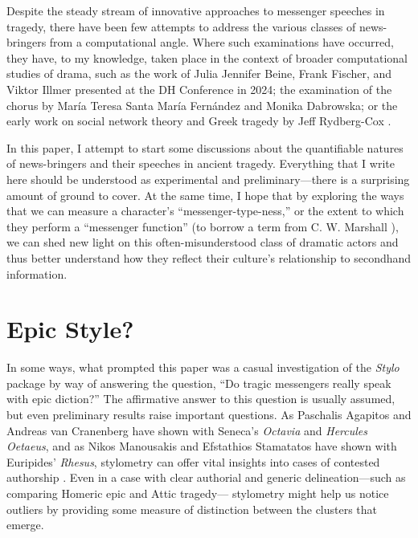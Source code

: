 \documentclass{jcls}
\begin{document}
Despite the steady stream of innovative approaches to messenger
speeches in tragedy, there have been few attempts to address the
various classes of news-bringers from a computational angle. Where
such examinations have occurred, they have, to my knowledge, taken
place in the context of broader computational studies
of drama, such as the work of Julia Jennifer Beine, Frank Fischer,
and Viktor Illmer presented at the DH Conference in 2024; the
examination of the chorus by María Teresa Santa María Fernández and
Monika Dabrowska; or the early work on social network theory and
Greek tragedy by Jeff Rydberg-Cox \cite{Beine.etal2024,
Fernandez.Dabrowska2023, Rydberg-Cox2011}.

In this paper, I attempt to start some discussions about the
quantifiable natures of news-bringers and their speeches in ancient
tragedy. Everything that I write here should be understood as
experimental and preliminary---there is a surprising amount of ground
to cover. At the same time, I hope that by exploring the ways that we
can measure a character's ``messenger-type-ness,'' or the extent to
which they perform a ``messenger function'' (to borrow a term from C.
W. Marshall \cite{Marshall2006}), we can shed new light on this
often-misunderstood class of dramatic actors and thus better
understand how they reflect their culture's relationship to
secondhand information.

\section{Epic Style?}

In some ways, what prompted this paper was a casual investigation of
the \textit{Stylo} package \cite{Eder.etal2016} by way of answering
the question, ``Do tragic messengers really speak with epic
diction?'' The affirmative answer to this question is usually
assumed, but even preliminary results raise important questions. As Paschalis
Agapitos and Andreas van Cranenberg have shown with Seneca's
\textit{Octavia} and \textit{Hercules Oetaeus}, and as Nikos
Manousakis and Efstathios Stamatatos have shown with Euripides'
\textit{Rhesus}, stylometry can offer vital insights into cases of
contested authorship \cite{Agapitos.vanCranenburgh2024,
Manousakis.Stamatatos2018}. Even in a case with clear authorial and
generic delineation---such as comparing Homeric epic and Attic tragedy---
stylometry might help us notice outliers by providing some measure
of distinction between the clusters that emerge.
\end{document}
